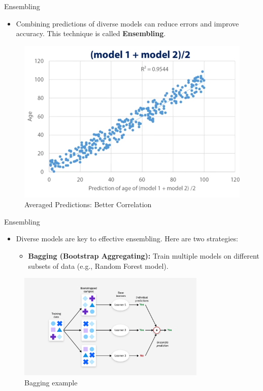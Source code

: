 \documentclass[10pt]{beamer}
\theoremstyle{remark}
\theoremstyle{definition}
\begin{document}
\begin{frame}{Ensembling}
\begin{itemize}
    \item Combining predictions of diverse models can reduce errors and improve accuracy. This technique is called \textbf{Ensembling}.
\end{itemize}

\begin{figure}
    \centering
    \includegraphics[width=0.7\linewidth]{./images/ensembling2.png} 
    \caption{Averaged Predictions: Better Correlation}
\end{figure}
\end{frame}

\begin{frame}{Ensembling}
\begin{itemize}
    \item Diverse models are key to effective ensembling. Here are two strategies:
    \begin{itemize}
        \item \textbf{Bagging (Bootstrap Aggregating):} Train multiple models on different subsets of data (e.g., Random Forest model).
    \end{itemize}
    \end{itemize}
    \begin{figure}
    \centering
    \includegraphics[width=0.8\textwidth,height=0.8\textheight,keepaspectratio]{./images/bagging.png}
    \caption{Bagging example}
\end{figure}
\end{frame}
\end{document}
